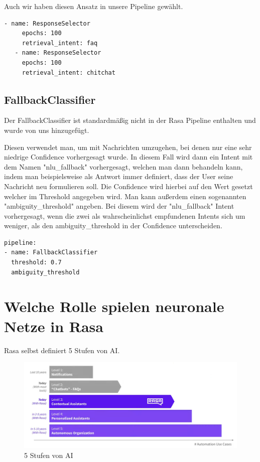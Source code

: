 Auch wir haben diesen Ansatz in unsere Pipeline gewählt.

\begin{lstlisting}[label={lst: Two ResponseSelectors in our Pipeline}]
- name: ResponseSelector
     epochs: 100
     retrieval_intent: faq
   - name: ResponseSelector
     epochs: 100
     retrieval_intent: chitchat
\end{lstlisting}

\subsection{FallbackClassifier}

Der FallbackClassifier ist standardmäßig nicht in der Rasa Pipeline enthalten und wurde von uns hinzugefügt.\cite{startingPipelines}

Diesen verwendet man, um mit Nachrichten umzugehen, bei denen nur eine sehr niedrige Confidence vorhergesagt wurde.
In diesem Fall wird dann ein Intent mit dem Namen "nlu\_fallback" vorhergesagt, welchen man dann behandeln kann, indem man beispielsweise als Antwort immer definiert, dass der User seine Nachricht neu formulieren soll.
Die Confidence wird hierbei auf den Wert gesetzt welcher im Threshold angegeben wird.\cite{fallbackClassifier, nluFallback}
Man kann außerdem einen sogenannten "ambiguity\_threshold" angeben.
Bei diesem wird der "nlu\_fallback" Intent vorhergesagt, wenn die zwei als wahrscheinlichst empfundenen Intents sich um weniger, als den ambiguity\_threshold in der Confidence unterscheiden.\cite{fallbackClassifier}

\begin{lstlisting}[label={lst: FallbackClassifier}]
pipeline:
- name: FallbackClassifier
  threshold: 0.7
  ambiguity_threshold
\end{lstlisting}

\section{Welche Rolle spielen neuronale Netze in Rasa}

Rasa selbst definiert 5 Stufen von AI\@.\cite{ai5Levels}

\begin{figure}[hbt!]
  \centering
  \includegraphics[scale=0.25]{pics/5_levels_of_ai}
  \caption{5 Stufen von AI~\cite{ai5LevelsVideo}}
  \label{fig:5_levels_of_ai}
\end{figure}

